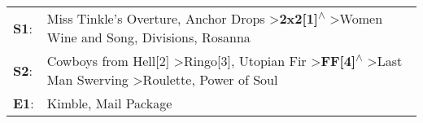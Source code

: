 \begin{supertabular}{p{0.03\textwidth}p{0.92\textwidth}}
 \textbf{S1}:  &                                                              Miss Tinkle's Overture\textsuperscript{}, \enspace Anchor Drops\textsuperscript{} \textgreater \enspace \textbf{2x2[1]\textsuperscript{$\wedge$}} \textgreater \enspace Women Wine and Song\textsuperscript{}, \enspace Divisions\textsuperscript{}, \enspace Rosanna\textsuperscript{}  \enspace  \\
 \textbf{S2}:  &  Cowboys from Hell[2]\textsuperscript{} \textgreater \enspace Ringo[3]\textsuperscript{}, \enspace Utopian Fir\textsuperscript{} \textgreater \enspace \textbf{FF[4]\textsuperscript{$\wedge$}} \textgreater \enspace Last Man Swerving\textsuperscript{} \textgreater \enspace Roulette\textsuperscript{}, \enspace Power of Soul\textsuperscript{}  \enspace  \\
 \textbf{E1}:  &                                                                                                                                                                                                                                                                                    Kimble\textsuperscript{}, \enspace Mail Package\textsuperscript{}  \enspace  \\
\end{supertabular}

